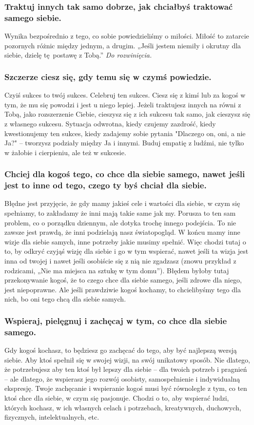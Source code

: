 \documentclass[../dotknieci-miloscia.tex]{subfiles}
\begin{document}
\subsubsection{Traktuj innych tak samo dobrze, jak chciałbyś traktować samego siebie.}
Wynika bezpośrednio z tego, co sobie powiedzieliśmy o miłości. 
Miłość to zatarcie pozornych różnic między jednym, a drugim.
„Jeśli jestem niemiły i okrutny dla siebie, dzielę tę postawę z Tobą.”
\emph{Do rozwinięcia.}

\subsubsection{Szczerze ciesz się, gdy temu się w czymś powiedzie.}
Czyiś sukces to twój sukces. 
Celebruj ten sukces. 
Ciesz się z kimś lub za kogoś w tym, że mu się powodzi i jest u niego lepiej. 
Jeżeli traktujesz innych na równi z Tobą, jako rozszerzenie Ciebie, 
cieszysz się z ich sukcesu tak samo, jak cieszysz się z własnego sukcesu. 
Sytuacja odwrotna, kiedy czujemy zazdrość, kiedy kwestionujemy ten sukces, 
kiedy zadajemy sobie pytania "Dlaczego on, oni, a nie Ja?" 
-- tworzysz podziały między Ja i innymi. 
Buduj empatię z ludźmi, nie tylko w żałobie i cierpieniu, ale też w sukcesie.

\subsubsection{Chciej dla kogoś tego, co chce dla siebie samego, nawet jeśli jest to inne od tego, czego ty byś chciał dla siebie.}
Błędne jest przyjęcie, że gdy mamy jakieś cele i wartości dla siebie, 
w czym się spełniamy, to zakładamy że inni mają takie same jak my.
Porusza to ten sam problem, co o porządku dziennym, ale dotyka trochę innego podejścia.
To nie zawsze jest prawdą, że inni podzielają nasz światopogląd.
W końcu mamy inne wizje dla siebie samych, inne potrzeby jakie musimy spełnić. 
Więc chodzi tutaj o to, by odkryć czyjąś wizję dla siebie i go w tym wspierać, 
nawet jeśli ta wizja jest inna od twojej i nawet jeśli osobiście się z nią nie zgadzasz 
(znowu przykład z rodzicami, „Nie ma miejsca na sztukę w tym domu”). 
Błędem byłoby tutaj przekonywanie kogoś, 
że to czego chce dla siebie samego, jeśli zdrowe dla niego, jest niepoprawne. 
Ale jeśli prawdziwie kogoś kochamy, 
to chcielibyśmy tego dla nich, bo oni tego chcą dla siebie samych. 

\subsubsection{Wspieraj, pielęgnuj i zachęcaj w tym, co chce dla siebie samego.}
Gdy kogoś kochasz, to będziesz go zachęcać do tego, aby być najlepszą wersją siebie. 
Aby ktoś spełnił się w swojej wizji, na swój unikatowy sposób. 
Nie dlatego, że potrzebujesz aby ten ktoś był lepszy dla siebie 
-- dla twoich potrzeb i pragnień 
-- ale dlatego, że wspierasz jego rozwój osobisty, samospełnienie i indywidualną ekspresję. 
Twoje zachęcanie i wspieranie kogoś musi być równoległe z tym, 
co ten ktoś chce dla siebie, w czym się pasjonuje. 
Chodzi o to, aby wspierać ludzi, których kochasz, 
w ich własnych celach i potrzebach, kreatywnych, duchowych, fizycznych, intelektualnych, etc.
\end{document}
